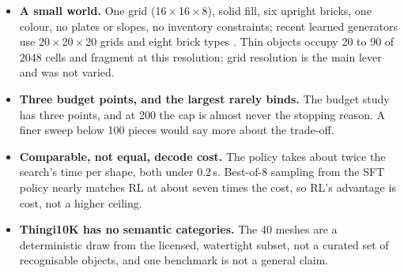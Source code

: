 \begin{itemize}
  seed for the v1 arms and the ablations, one decode seed (decoding is deterministic). Every reporting guideline we know of asks for
  more seeds than this \citep{henderson2018drlmatters,colas2018howmanyseeds,agarwal2021precipice}. Differences below
  about 0.02 should be read as observed, not established. We report ranges, not confidence intervals.
  \item \textbf{A small world.} One grid (16\,$\times$\,16\,$\times$\,8), solid fill, six upright bricks, one colour, no
  plates or slopes, no inventory constraints; recent learned generators use 20\,$\times$\,20\,$\times$\,20 grids and
  eight brick types \citep{pun2025brickgpt,ahn2024brecs}. Thin objects occupy 20 to 90 of 2048 cells and fragment at this
  resolution; grid resolution is the main lever and was not varied.
  \item \textbf{Three budget points, and the largest rarely binds.} The budget study has three points, and at 200 the
  cap is almost never the stopping reason. A finer sweep below 100 pieces would say more about the trade-off.
  \item \textbf{Comparable, not equal, decode cost.} The policy takes about twice the search's time per shape, both
  under 0.2\,s. Best-of-8 sampling from the SFT policy nearly matches RL at about seven times the cost, so RL's
  advantage is cost, not a higher ceiling.
  \item \textbf{Thingi10K has no semantic categories.} The 40 meshes are a deterministic draw from the licensed,
  watertight subset, not a curated set of recognisable objects, and one benchmark is not a general claim.
\end{itemize}
